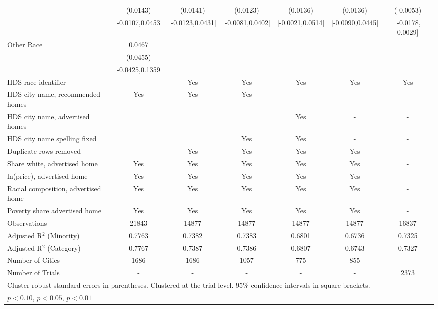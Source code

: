 \begin{table}[htbp]
{\begin{tabular}{l*{6}{c}}
 & (0.0143) & (0.0141) & (0.0123) & (0.0136) & (0.0136) & ( 0.0053) \\
 & [-0.0107,0.0453] & [-0.0123,0.0431] & [-0.0081,0.0402] & [-0.0021,0.0514] & [-0.0090,0.0445] & [-0.0178,  0.0029] \\
Other Race & 0.0467 &  &  &  &  &  \\
 & (0.0455) &  &  &  &  &  \\
 & [-0.0425,0.1359] &  &  &  &  &  \\
\midrule
HDS race identifier & & Yes & Yes & Yes & Yes & Yes \\
HDS city name, recommended homes & Yes & Yes & Yes & & - & -\\
HDS city name, advertised homes &  &  &  & Yes & - & -\\
HDS city name spelling fixed & & & Yes & Yes & - & -\\
Duplicate rows removed &  & Yes & Yes & Yes & Yes & - \\
\midrule
Share white, advertised home  & Yes & Yes & Yes & Yes & Yes & - \\
ln(price), advertised home  & Yes & Yes & Yes & Yes & Yes & - \\
Racial composition, advertised home & Yes & Yes & Yes & Yes & Yes & - \\
Poverty share advertised home & Yes & Yes & Yes & Yes & Yes & - \\
Observations & 21843 & 14877 & 14877 & 14877 & 14877 & 16837 \\
Adjusted R$^2$ (Minority) & 0.7763 & 0.7382 & 0.7383 & 0.6801 & 0.6736 & 0.7325 \\
Adjusted R$^2$ (Category) & 0.7767 & 0.7387 & 0.7386 & 0.6807 & 0.6743 & 0.7327 \\
Number of Cities & 1686 & 1686 & 1057 & 775 & 855 & - \\
Number of Trials & - & - & - & - & - & 2373 \\
\bottomrule
\multicolumn{7}{l}{\footnotesize Cluster-robust standard errors in parentheses. Clustered at the trial level. 95\% confidence intervals in square brackets.}\\
\multicolumn{7}{l}{\footnotesize \sym{*} \(p<0.10\), \sym{**} \(p<0.05\), \sym{***} \(p<0.01\)}\\
\end{tabular}
}
\end{table}
